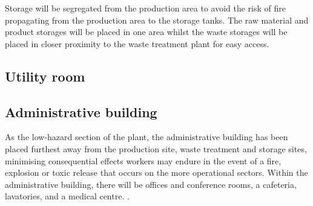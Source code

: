 Storage will be segregated from the production area to avoid the risk of fire propagating from the production area to the storage tanks. The raw material and product storages will be placed in one area whilst the waste storages will be placed in closer proximity to the waste treatment plant for easy access.  


\subsection{Utility room}


\subsection{Administrative building}

As the low-hazard section of the plant, the administrative building has been placed furthest away from the production site, waste treatment and storage sites, minimising  consequential effects workers may endure in the event of a fire, explosion or toxic release that occurs on the more operational sectors. Within the administrative building, there will be offices and conference rooms, a cafeteria, lavatories, and a medical centre. \cite{sinnott_coulson_2005}. 